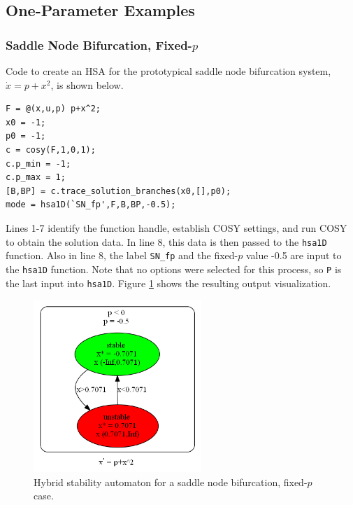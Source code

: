 \documentclass[12pt]{article}
\begin{document}
\subsection{One-Parameter Examples}

\subsubsection{Saddle Node Bifurcation, Fixed-$p$}
\label{snhsa}
Code to create an HSA for the prototypical saddle node bifurcation system, $\dot{x}=p+x^2$, is shown below.

\begin{addmargin}[0.5in]{1em}
\begin{lstlisting}
F = @(x,u,p) p+x^2;  
x0 = -1; 
p0 = -1;
c = cosy(F,1,0,1);
c.p_min = -1;              
c.p_max = 1;
[B,BP] = c.trace_solution_branches(x0,[],p0);
mode = hsa1D(`SN_fp',F,B,BP,-0.5);
\end{lstlisting}
\end{addmargin}

\noindent Lines 1-7 identify the function handle, establish COSY settings, and run COSY to obtain the solution data. In line 8, this data is then passed to the \texttt{hsa1D} function. Also in line 8, the label \texttt{SN\_fp} and the fixed-$p$ value -0.5 are input to the \texttt{hsa1D} function. Note that no options were selected for this process, so \texttt{P} is the last input into \texttt{hsa1D}. Figure \ref{SN_fp} shows the resulting output visualization. 

\begin{figure}[H]
\begin{center}
\includegraphics[width=2.5in]{SN_fp.png}
\caption{Hybrid stability automaton for a saddle node bifurcation, fixed-$p$ case.}
\label{SN_fp}
\end{center}
\end{figure}
\end{document}
